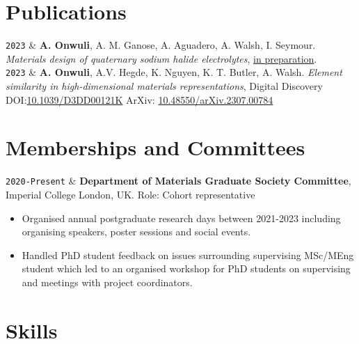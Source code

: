 \documentclass[11pt,a4paper]{article}
\newcommand{\ICL}{Imperial College London}
\newcommand{\LastName}{Onwuli}
\newcommand{\Initials}{A}
\newcommand{\Me}{\textbf{\Initials. \LastName}}  %
\newcommand{\Aron}{A. Walsh}
\newcommand{\Keith}{K. T. Butler}
\newcommand{\Alex}{A. M. Ganose}
\newcommand{\Ieuan}{I. Seymour}
\newcommand{\Ainara}{A. Aguadero}
\newcommand{\Ashish}{A.V. Hegde}
\newcommand{\Kevin}{K. Nguyen}
\newcommand{\Duration}[2]{\fontsize{10pt}{0}\selectfont \texttt{#1-#2}}
\newcommand{\Year}[1]{\fontsize{10pt}{0}\selectfont \texttt{#1}}
\newcommand{\Ongoing}{Present}
\newcommand{\DOI}[1]{DOI:\href{https://doi.org/#1}{#1}}
\newcommand{\Preprint}[1]{\faFilePdf{} ArXiv: \href{https://doi.org/#1}{#1}}
\begin{document}
\section{Publications}

\begin{EntriesTableYear}
  \Year{2023}  &
  \Me, \Alex, \Ainara, \Aron, \Ieuan.
  \textit{Materials design of quaternary sodium halide electrolytes},
  \underline{in preparation}.
  \\
  \Year{2023}  &
  \Me, \Ashish, \Kevin, \Keith, \Aron.
  \textit{Element similarity in high-dimensional materials representations},
  \newline
  Digital Discovery
  \DOI{10.1039/D3DD00121K}
  \Preprint{10.48550/arXiv.2307.00784} 
  \\
\end{EntriesTableYear}
\section{Memberships and Committees}

\begin{EntriesTableDuration}
  \Duration{2020}{\Ongoing} &
  \textbf{Department of Materials Graduate Society Committee}, \ICL{}, UK.
  \newline
  Role: Cohort representative
  \begin{itemize}
    \item Organised annual postgraduate research days between 2021-2023 including organising speakers, poster sessions and social events.
    \item Handled PhD student feedback on issues surrounding supervising MSc/MEng student which led to an organised workshop for PhD students on supervising and meetings with project coordinators.
    \vspace{-\baselineskip}
  \end{itemize}
  \vspace{-\baselineskip}
\end{EntriesTableDuration}
\section{Skills}
\end{document}
